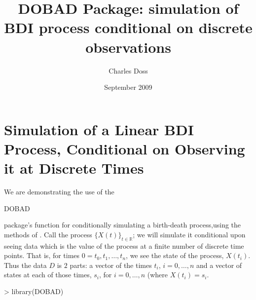 \documentclass[12pt]{article}
\title{DOBAD Package:  simulation of BDI process conditional on discrete observations}
\author{Charles Doss}
\date{September 2009}
\def\R{\mathbb{R}}
\begin{document}
\begin{titlepage}
\maketitle
\end{titlepage}


\vspace{-3.7mm} %






\part{Simulation of a Linear BDI Process, Conditional on Observing it
  at Discrete Times}

We are demonstrating the use of the
\begin{verb}
DOBAD
\end{verb}
package's function for conditionally simulating a birth-death
process,using the methods of \citet{DSHKM2010EM}.  Call the process
$\{X(t)\}_{t \in \R}$; we will simulate it conditional upon seeing
data which is the value of the process at a finite number of discrete
time points.  That is, for times $0=t_0, t_1, \ldots, t_n$, we see the
state of the process, $X(t_i)$.  Thus the data $D$ is $2$ parts: a
vector of the times $t_i$, $i= 0, \ldots, n$ and a vector of states at
each of those times, $s_i$, for $i=0, \ldots, n$ (where $X(t_i) =
s_i$.

\begin{Schunk}
\begin{Sinput}
> library(DOBAD)
\end{Sinput}
\end{Schunk}
\end{document}

